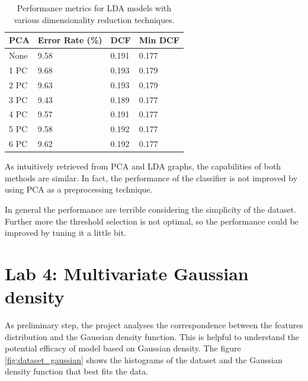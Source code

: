 \documentclass{article}
\begin{document}
\begin{table}[ht!]
    \centering
    \begin{tabularx}{\textwidth}{lXXX}
        \toprule
        \textbf{PCA} & \textbf{Error Rate (\%)} & \textbf{DCF} & \textbf{Min DCF} \\
        \midrule
        None   & 9.58 & 0.191 & 0.177 \\
        1 PC   & 9.68 & 0.193 & 0.179 \\
        2 PC   & 9.63 & 0.193 & 0.179 \\
        3 PC   & 9.43 & 0.189 & 0.177 \\
        4 PC   & 9.57 & 0.191 & 0.177 \\
        5 PC   & 9.58 & 0.192 & 0.177 \\
        6 PC   & 9.62 & 0.192 & 0.177 \\
        \bottomrule
    \end{tabularx}
    \caption{Performance metrics for LDA models with various dimensionality reduction techniques.}
    \label{tab:lda_performance}
\end{table}


As intuitively retrieved from PCA and LDA graphs, the capabilities of both methods are similar. In fact, the performance of the classifier is not improved by using PCA as a preprocessing technique. 

In general the performance are terrible considering the simplicity of the dataset. Further more the threshold selection is not optimal, so the performance could be improved by tuning it a little bit.

\section{Lab 4: Multivariate Gaussian density}
\label{sec:gaussian_density}
As preliminary step, the project analyses the correspondence between the features distribution and the Gaussian density function. This is helpful to understand the potential efficacy of model based on Gaussian density.
The figure \ref{fig:dataset_gaussian} shows the histograms of the dataset and the Gaussian density function that best fits the data.
\end{document}
